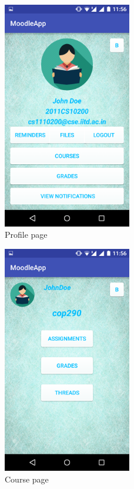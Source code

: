 \documentclass[12pt]{article}
\begin{document}
\begin{figure}[!ht]
	\centering
	\includegraphics[width=0.5\textwidth]{./profile}
	\caption{Profile page}
\end{figure}

\begin{figure}[!ht]
	\centering
	\includegraphics[width=0.5\textwidth]{./course}
	\caption{Course page}
\end{figure}
\end{document}
